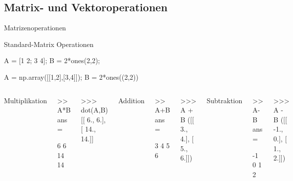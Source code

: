 \documentclass[hyperref={xetex}]{beamer}
\begin{document}
\subsection{Matrix- und Vektoroperationen}
%
%
\begin{frame}[fragile]{Matrizenoperationen}

Standard-Matrix Operationen \mcode{+,-,*}
\begin{matlabin}
A = [1 2; 3 4]; B = 2*ones(2,2);
\end{matlabin}
\begin{pyin}
A = np.array([[1,2],[3,4]]); B = 2*ones((2,2))
\end{pyin}
\begin{columns}[t]%
%
Multiplikation
\begin{matlabin}
>>  A*B
ans =

     6     6
    14    14
\end{matlabin}
\begin{pyin}
>>> dot(A,B)
[[  6.,   6.],
 [ 14.,  14.]]
\end{pyin}
%
Addition
\begin{matlabin}
>> A+B
ans =

     3     4
     5     6
\end{matlabin}
\begin{pyin}
>>> A + B
([[ 3.,  4.],
  [ 5.,  6.]])
\end{pyin}

%
Subtraktion
\begin{matlabin}
>> A-B
ans =

    -1     0
     1     2
\end{matlabin}
\begin{pyin}
>>> A - B
([[ -1.,  0.],
  [ 1.,  2.]])
\end{pyin}
\end{columns}
\end{frame}
%
%
\end{document}
